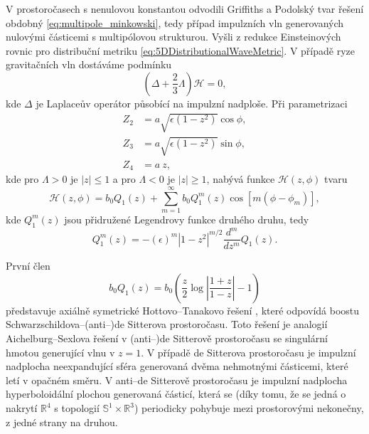 V prostoročasech s nenulovou konstantou odvodili Griffiths a Podolský \cite{Podolsky1997} tvar řešení obdobný \eqref{eq:multipole_minkowski},
tedy případ impulzních vln generovaných nulovými částicemi s multipólovou strukturou. Vyšli z redukce Einsteinových rovnic pro distribuční
metriku \eqref{eq:5DDistributionalWaveMetric}. V případě ryze gravitačních vln dostáváme podmínku
\begin{equation}
    \label{eq:podminka_na_H_lambda_stare}
    \left(\Delta + \frac{2}{3} \Lambda \right)\mathcal{H} = 0,
\end{equation}
kde $\Delta$ je Laplaceův operátor působící na impulzní nadploše. Při parametrizaci 
\begin{equation}
    \begin{split}
        Z_2 &= a \sqrt{\epsilon(1-z^2)} \cos \phi,\\
        Z_3 &= a \sqrt{\epsilon(1-z^2)} \sin \phi,\\
        Z_4 &= a~z,
    \end{split}
\end{equation}
kde pro $\Lambda > 0$ je $\left|z\right| \leq 1$ a pro $\Lambda < 0$ je $\left|z\right| \geq 1$,
nabývá funkce $\mathcal{H}(z, \phi)$ tvaru
\begin{equation}
    \mathcal{H}(z, \phi) = b_0 Q_1(z) + \sum_{m=1}^\infty b_0 Q_1^m(z) \cos [m(\phi - \phi_m)],
\end{equation}
kde $Q_1^m(z)$ jsou přidružené Legendrovy funkce druhého druhu, tedy
\begin{equation}
    Q_1^m(z) = -(\epsilon)^m |1-z^2|^{m/2} \frac{d^m}{dz^m}Q_1(z).
\end{equation}

První člen
\begin{equation}
    b_0 Q_1(z) = b_0 \left(\frac{z}{2} \log \left|\frac{1+z}{1-z}\right| - 1\right)
\end{equation}
představuje axiálně symetrické Hottovo--Tanakovo řešení \cite{Hotta_1993}, které odpovídá boostu Schwarzschildova--(anti--)de Sitterova
prostoročasu. Toto řešení je analogií Aichelburg--Sexlova řešení v (anti--)de Sitterově prostoročasu se singulární hmotou generující vlnu v $z=1$. V případě de Sitterova prostoročasu je impulzní nadplocha
neexpandující sféra generovaná dvěma nehmotnými částicemi, které letí v opačném směru. V anti--de Sitterově prostoročasu je impulzní nadplocha hyperboloidální
plochou generovaná částicí, která se (díky tomu, že se jedná o nakrytí $\mathbb{R}^4$ s topologií $\mathbb{S}^1 \times \mathbb{R}^3$) periodicky pohybuje mezi prostorovými nekonečny,
z jedné strany na druhou.

